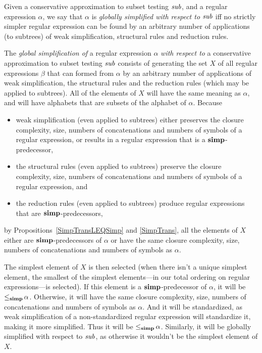 %
%
%

Given a conservative approximation to subset testing ${\it sub}$, and a
%
regular expression $\alpha$, we say that $\alpha$ is \emph{globally
  simplified with respect to} ${\it sub}$ iff no strictly simpler regular
expression can be found by an arbitrary number of applications (to
subtrees) of weak simplification, structural rules and reduction
rules.

The \emph{global simplification of} a regular expression $\alpha$
\emph{with respect to} a conservative approximation to subset testing
${\it sub}$ consists of generating the set $X$ of all regular expressions
$\beta$ that can formed from $\alpha$ by an arbitrary number of
applications of weak simplification, the structural rules and the
reduction rules (which may be applied to subtrees). All of the
elements of $X$ will have the same meaning as $\alpha$, and will have
alphabets that are subsets of the alphabet of $\alpha$. Because
\begin{itemize}
\item weak simplification (even applied to subtrees) either preserves
  the closure complexity, size, numbers of concatenations and numbers
  of symbols of a regular expression, or results in a regular
  expression that is a $\mathrel{\mathbf{simp}}$-predecessor,

\item the structural rules (even applied to subtrees) preserve the
  closure complexity, size, numbers of concatenations and numbers of
  symbols of a regular expression, and

\item the reduction rules (even applied to subtrees) produce regular
  expressions that are $\mathrel{\mathbf{simp}}$-predecessors,
\end{itemize}
by Propositions~\ref{SimpTransLEQSimp} and \ref{SimpTrans}, all the
elements of $X$ either are ${\mathrel{\mathbf{simp}}}$-predecessors of $\alpha$ or have
the same closure complexity, size, numbers of concatenations and
numbers of symbols as $\alpha$.

The simplest element of $X$ is then selected (when there isn't a
unique simplest element, the smallest of the simplest elements---in
our total ordering on regular expressions---is selected).  If this
element is a $\mathrel{\mathbf{simp}}$-predecessor of $\alpha$, it will be
${\mathrel{\leq_{\mathbf{simp}}}}\,\alpha$. Otherwise, it will have the same closure
complexity, size, numbers of concatenations and numbers of symbols as
$\alpha$. And it will be standardized, as weak simplification of a
non-standardized regular expression will standardize it, making it
more simplified. Thus it will be ${\mathrel{\leq_{\mathbf{simp}}}}\,\alpha$.  Similarly, it
will be globally simplified with respect to ${\it sub}$, as otherwise it
wouldn't be the simplest element of $X$.

